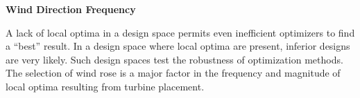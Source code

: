 \vspace{3mm}
\noindent\textbf{Wind Direction Frequency}

	
	
	\noindent A lack of local optima in a design space permits even inefficient optimizers to find a ``best'' result.
	In a design space where local optima are present, inferior designs are very likely.
	Such design spaces test the robustness of optimization methods.
	The selection of wind rose is a major factor in the frequency and magnitude of local optima resulting from turbine placement.

	
	


